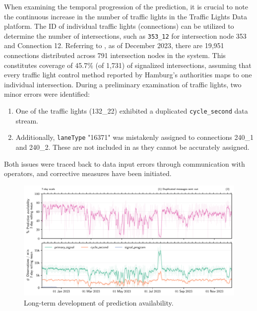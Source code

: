 When examining the temporal progression of the prediction, it is crucial to note the continuous increase in the number of traffic lights in the Traffic Lights Data platform. The ID of individual traffic lights (connections) can be utilized to determine the number of intersections, such as \texttt{353\_12} for intersection node 353 and Connection 12. Referring to , as of December 2023, there are 19,951 connections distributed across 791 intersection nodes in the system. This constitutes coverage of 45.7\% (of 1,731) of signalized intersections, assuming that every traffic light control method reported by Hamburg's authorities maps to one individual intersection. During a preliminary examination of traffic lights, two minor errors were identified:

\begin{enumerate}
    \item One of the traffic lights (132\_22) exhibited a duplicated \texttt{cycle\_second} data stream.
    \item Additionally, \texttt{laneType} "16371" was mistakenly assigned to connections 240\_1 and 240\_2. These are not included in  as they cannot be accurately assigned.
\end{enumerate}

Both issues were traced back to data input errors through communication with operators, and corrective measures have been initiated.

\begin{figure}[t]
    \centering
    \includegraphics[width=\linewidth]{images/monitoring-availability.pdf}
    \caption{Long-term development of prediction availability.}\label{fig:monitoring-availability}
\end{figure}


